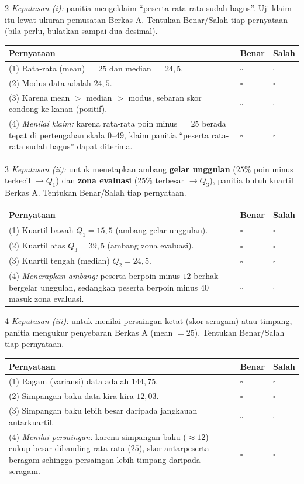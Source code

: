 \documentclass[11pt]{article}
\makeatletter
\newenvironment{bstabel}{%
  \par\smallskip\begin{center}\renewcommand{\arraystretch}{1.35}%
  \begin{tabular}{@{}p{0.72\textwidth}>{\centering\arraybackslash}m{1.5cm}>{\centering\arraybackslash}m{1.5cm}@{}}
  \toprule
  \textbf{Pernyataan} & \textbf{Benar} & \textbf{Salah}\\\midrule}%
  {\bottomrule\end{tabular}\end{center}}
\newcommand{\bs}[1]{#1 & $\square$ & $\square$\\[1pt]}
\makeatother
\begin{document}
\begin{soal}{2}
\emph{Keputusan (i):} panitia mengeklaim ``peserta rata-rata sudah bagus''. Uji
klaim itu lewat ukuran pemusatan Berkas A. Tentukan Benar/Salah tiap pernyataan
(bila perlu, bulatkan sampai dua desimal).
\begin{bstabel}
  \bs{(1) Rata-rata (mean) $=25$ dan median $=24{,}5$.}
  \bs{(2) Modus data adalah $24{,}5$.}
  \bs{(3) Karena mean $>$ median $>$ modus, sebaran skor condong ke kanan (positif).}
  \bs{(4) \emph{Menilai klaim:} karena rata-rata poin minus $=25$ berada tepat di pertengahan skala $0$--$49$, klaim panitia ``peserta rata-rata sudah bagus'' dapat diterima.}
\end{bstabel}
\end{soal}

\begin{soal}{3}
\emph{Keputusan (ii):} untuk menetapkan ambang \textbf{gelar unggulan} ($25\%$
poin minus terkecil $\to Q_1$) dan \textbf{zona evaluasi} ($25\%$ terbesar $\to
Q_3$), panitia butuh kuartil Berkas A. Tentukan Benar/Salah tiap pernyataan.
\begin{bstabel}
  \bs{(1) Kuartil bawah $Q_1=15{,}5$ (ambang gelar unggulan).}
  \bs{(2) Kuartil atas $Q_3=39{,}5$ (ambang zona evaluasi).}
  \bs{(3) Kuartil tengah (median) $Q_2=24{,}5$.}
  \bs{(4) \emph{Menerapkan ambang:} peserta berpoin minus $12$ berhak bergelar unggulan, sedangkan peserta berpoin minus $40$ masuk zona evaluasi.}
\end{bstabel}
\end{soal}

\begin{soal}{4}
\emph{Keputusan (iii):} untuk menilai persaingan ketat (skor seragam) atau timpang,
panitia mengukur penyebaran Berkas A (mean $=25$). Tentukan Benar/Salah tiap pernyataan.
\begin{bstabel}
  \bs{(1) Ragam (variansi) data adalah $144{,}75$.}
  \bs{(2) Simpangan baku data kira-kira $12{,}03$.}
  \bs{(3) Simpangan baku lebih besar daripada jangkauan antarkuartil.}
  \bs{(4) \emph{Menilai persaingan:} karena simpangan baku ($\approx12$) cukup besar dibanding rata-rata ($25$), skor antarpeserta beragam sehingga persaingan lebih timpang daripada seragam.}
\end{bstabel}
\end{soal}
\end{document}
